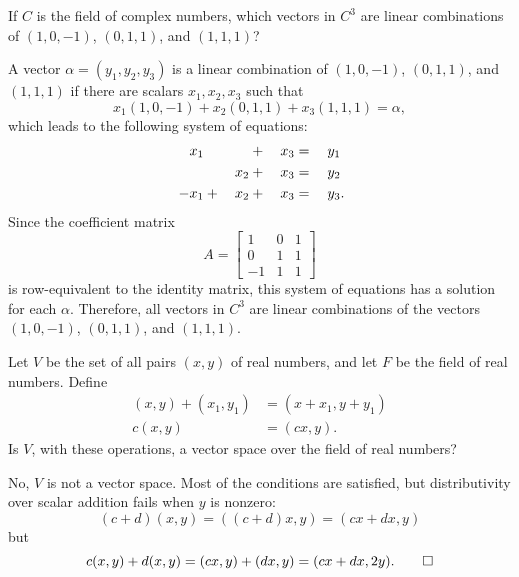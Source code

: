  If $C$ is the field of complex numbers, which vectors in
$C^3$ are linear combinations of $(1,0,-1)$, $(0,1,1)$, and $(1,1,1)$?
\begin{solution}
  A vector $\alpha = (y_1,y_2,y_3)$ is a linear combination of
  $(1,0,-1)$, $(0,1,1)$, and $(1,1,1)$ if there are scalars
  $x_1,x_2,x_3$ such that
  \begin{equation*}
    x_1(1, 0, -1) + x_2(0, 1, 1) + x_3(1, 1, 1) = \alpha,
  \end{equation*}
  which leads to the following system of equations:
  \begin{alignat*}{4}
    \phantom{{}-}x_1 &&  &{}+{}& x_3 &{}={}& y_1 \\
    && x_2 &{}+{}& x_3 &{}={}& y_2 \\
    -x_1 &{}+{}& x_2 &{}+{}& x_3 &{}={}& y_3\rlap.
  \end{alignat*}
  Since the coefficient matrix
  \begin{equation*}
    A =
    \begin{bmatrix}
      1 & 0 & 1 \\
      0 & 1 & 1 \\
      -1 & 1 & 1
    \end{bmatrix}
  \end{equation*}
  is row-equivalent to the identity matrix, this system of equations
  has a solution for each $\alpha$. Therefore, all vectors in $C^3$
  are linear combinations of the vectors $(1,0,-1)$, $(0,1,1)$, and
  $(1,1,1)$.
\end{solution}

 Let $V$ be the set of all pairs $(x,y)$ of real numbers,
and let $F$ be the field of real numbers. Define
\begin{align*}
  (x,y) + (x_1,y_1) &= (x + x_1, y + y_1) \\
  c(x,y) &= (cx,y).
\end{align*}
Is $V$, with these operations, a vector space over the field of real
numbers?
\begin{solution}
  No, $V$ is not a vector space. Most of the conditions are satisfied,
  but distributivity over scalar addition fails when $y$ is nonzero:
  \begin{equation*}
    (c + d)(x,y) = ((c + d)x, y) = (cx + dx, y)
  \end{equation*}
  but
  \begin{equation*}
    c(x,y) + d(x,y) = (cx, y) + (dx,y) = (cx + dx, 2y). \qedhere
  \end{equation*}
\end{solution}

